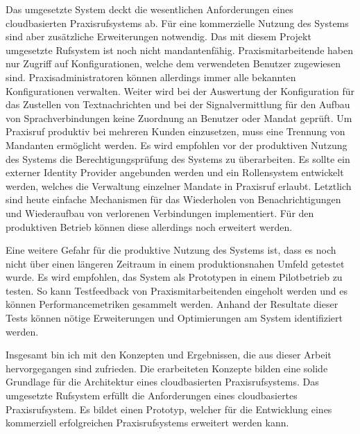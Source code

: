 Das umgesetzte System deckt die wesentlichen Anforderungen eines cloudbasierten Praxisrufsystems ab.
Für eine kommerzielle Nutzung des Systems sind aber zusätzliche Erweiterungen notwendig.
Das mit diesem Projekt umgesetzte Rufsystem ist noch nicht mandantenfähig.
Praxismitarbeitende haben nur Zugriff auf Konfigurationen, welche dem verwendeten Benutzer zugewiesen sind.
Praxisadministratoren können allerdings immer alle bekannten Konfigurationen verwalten.
Weiter wird bei der Auswertung der Konfiguration für das Zustellen von Textnachrichten und bei der Signalvermittlung für den Aufbau von Sprachverbindungen keine Zuordnung an Benutzer oder Mandat geprüft.
Um Praxisruf produktiv bei mehreren Kunden einzusetzen, muss eine Trennung von Mandanten ermöglicht werden.
Es wird empfohlen vor der produktiven Nutzung des Systems die Berechtigungsprüfung des Systems zu überarbeiten.
Es sollte ein externer Identity Provider angebunden werden und ein Rollensystem entwickelt werden, welches die Verwaltung einzelner Mandate in Praxisruf erlaubt.
Letztlich sind heute einfache Mechanismen für das Wiederholen von Benachrichtigungen und Wiederaufbau von verlorenen Verbindungen implementiert.
Für den produktiven Betrieb können diese allerdings noch erweitert werden.

Eine weitere Gefahr für die produktive Nutzung des Systems ist, dass es noch nicht über einen längeren Zeitraum in einem produktionsnahen Umfeld getestet wurde.
Es wird empfohlen, das System als Prototypen in einem Pilotbetrieb zu testen.
So kann Testfeedback von Praxismitarbeitenden eingeholt werden und es können Performancemetriken gesammelt werden.
Anhand der Resultate dieser Tests können nötige Erweiterungen und Optimierungen am System identifiziert werden.

Insgesamt bin ich mit den Konzepten und Ergebnissen, die aus dieser Arbeit hervorgegangen sind zufrieden.
Die erarbeiteten Konzepte bilden eine solide Grundlage für die Architektur eines cloudbasierten Praxisrufsystems.
Das umgesetzte Rufsystem erfüllt die Anforderungen eines cloudbasiertes Praxisrufsystem.
Es bildet einen Prototyp, welcher für die Entwicklung eines kommerziell erfolgreichen Praxisrufsystems erweitert werden kann.

\clearpage
